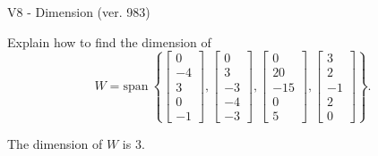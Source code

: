 \begin{exercise}
  \begin{exerciseTitle}V8 - Dimension (ver. 983)\end{exerciseTitle}
  \begin{exerciseStatement}
    Explain how to find the dimension of 
\[W=\mathrm{span}\ \left\{\left[\begin{array}{r}
0 \\
-4 \\
3 \\
0 \\
-1
\end{array}\right] , \left[\begin{array}{r}
0 \\
3 \\
-3 \\
-4 \\
-3
\end{array}\right] , \left[\begin{array}{r}
0 \\
20 \\
-15 \\
0 \\
5
\end{array}\right] , \left[\begin{array}{r}
3 \\
2 \\
-1 \\
2 \\
0
\end{array}\right]\right\}.\]



  \end{exerciseStatement}
  \begin{exerciseAnswer}
   The dimension of \(W\) is  \(3\).
  


  \end{exerciseAnswer}
\end{exercise}
